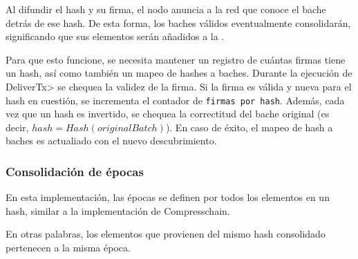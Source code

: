 %
Al difundir el hash y su firma, el nodo anuncia a la red que conoce el bache detrás de ese hash.
%
De esta forma, los baches válidos eventualmente consolidarán, significando que sus elementos
serán añadidos a la \setchain.

Para que esto funcione, se necesita mantener un registro de cuántas firmas tiene un hash,
así como también un mapeo de hashes a baches.
%
Durante la ejecución de \<DeliverTx> se chequea la validez de la firma.
%
Si la firma es válida y nueva para el hash en cuestión, se incrementa el contador de
\texttt{firmas por hash}.
%
Además, cada vez que un hash es invertido, se chequea la correctitud del bache original
(es decir, $hash = Hash(originalBatch)$). En caso de éxito, el mapeo de hash a baches
es actualiado con el nuevo descubrimiento.

%


%




\subsubsection{Consolidación de épocas}\label{subsubsec:consolidation}

En esta implementación, las épocas se definen por todos los elementos en un hash, similar
a la implementación de Compresschain.

%
En otras palabras, los elementos que provienen del mismo hash consolidado pertenecen a la
misma época.

